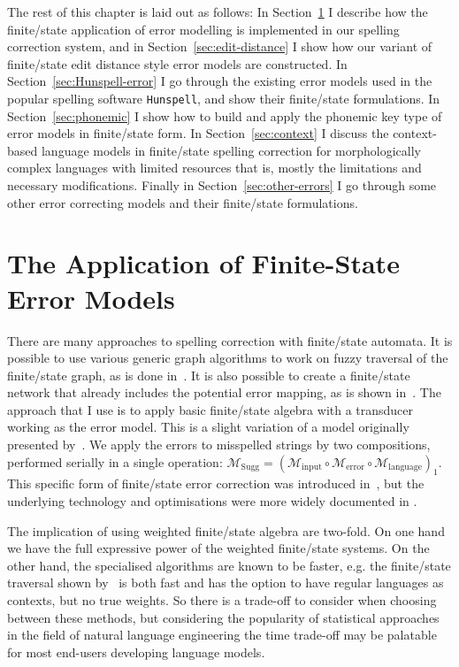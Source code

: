 \documentclass[officiallayout]{unihelcompling}
\begin{document}
The rest of this chapter is laid out as follows: In
Section~\ref{sec:error-application} I describe how the finite\-/state
application of error modelling is implemented in our spelling correction system,
and in Section~\ref{sec:edit-distance} I show how our variant of finite\-/state
edit distance style error models are constructed.  In
Section~\ref{sec:Hunspell-error} I go through the existing error models used in
the popular spelling software \texttt{Hunspell}, and show their finite\-/state
formulations. In Section~\ref{sec:phonemic} I show how to build and apply the
phonemic key type of error models in finite\-/state form.  In
Section~\ref{sec:context} I discuss the context-based language models in
finite\-/state spelling correction for morphologically complex languages with
limited resources that is, mostly the limitations and necessary modifications.
Finally in Section~\ref{sec:other-errors} I go through some other error
correcting models and their finite\-/state formulations.

\section{The Application of Finite-State Error Models}
\label{sec:error-application}

There are many approaches to spelling correction with finite\-/state automata.
It is possible to use various generic graph algorithms to work on fuzzy
traversal of the finite\-/state graph, as is done in~\citet{hulden2009fast}.
It is also possible to create a finite\-/state network that already includes
the potential error mapping, as is shown in~\citet{schulz2002fast}. The
approach that I use is to apply basic finite\-/state algebra with a transducer
working as the error model. This is a slight variation of a model
originally presented by~\citet{mohri2003edit}. We apply the errors to
misspelled strings by two compositions, performed serially in a single
operation: $\mathcal{M}_{\mathrm{Sugg}} = (\mathcal{M}_{\mathrm{input}} \circ
\mathcal{M}_{\mathrm{error}} \circ \mathcal{M}_{\mathrm{language}})_1$.  This
specific form of finite\-/state error correction was introduced
in~, but the underlying technology and
optimisations were more widely documented in \citet{linden2011hfst}.

The implication of using weighted finite\-/state algebra are two-fold. On one
hand we have the full expressive power of the weighted finite\-/state
systems.  On the other hand, the specialised algorithms are known to be faster,
e.g.  the finite\-/state traversal shown by~\citet{hulden2009fast} is both fast
and has the option to have regular languages as contexts, but no true weights.
So there is a trade-off to consider when choosing between these methods, but
considering the popularity of statistical approaches in the field of natural
language engineering the time trade-off may be palatable for most end-users
developing language models.
\end{document}
